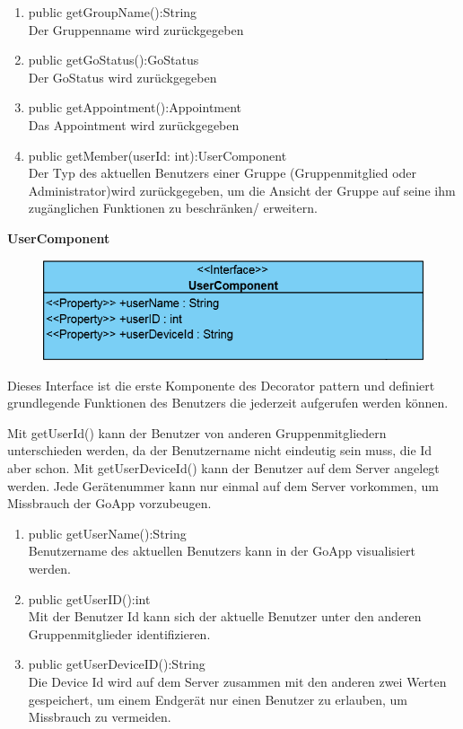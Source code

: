 \begin{enumerate}
	\item public getGroupName():String\\
		Der Gruppenname wird zurückgegeben 
	\item public getGoStatus():GoStatus \\
		Der GoStatus wird zurückgegeben
	\item public getAppointment():Appointment \\
		Das Appointment wird zurückgegeben
	\item public getMember(userId: int):UserComponent \\
		Der Typ des aktuellen Benutzers einer Gruppe (Gruppenmitglied oder Administrator)wird zurückgegeben, um die Ansicht der Gruppe auf seine ihm zugänglichen Funktionen zu beschränken/ erweitern.
\end{enumerate}

\textbf{UserComponent}
\begin{figure}[H]
	\includegraphics[scale = .5]{res/umlClasses/UserComponent.png}
	\centering
\end{figure}
Dieses Interface ist die erste Komponente des Decorator pattern und definiert grundlegende Funktionen des Benutzers die jederzeit aufgerufen werden können. 

Mit getUserId() kann der Benutzer von anderen Gruppenmitgliedern unterschieden werden, da der Benutzername nicht eindeutig sein muss, die Id aber schon.
Mit getUserDeviceId() kann der Benutzer auf dem Server angelegt werden. Jede Gerätenummer kann nur einmal auf dem Server vorkommen, um Missbrauch der GoApp vorzubeugen.
\begin{enumerate}
	\item public getUserName():String\\
		Benutzername des aktuellen Benutzers kann in der GoApp visualisiert werden.
	\item public getUserID():int\\
		Mit der Benutzer Id kann sich der aktuelle Benutzer unter den anderen Gruppenmitglieder identifizieren.
	\item public getUserDeviceID():String\\
		Die Device Id wird auf dem Server zusammen mit den anderen zwei Werten gespeichert, um einem Endgerät nur einen Benutzer zu erlauben, um Missbrauch zu vermeiden.
\end{enumerate}

